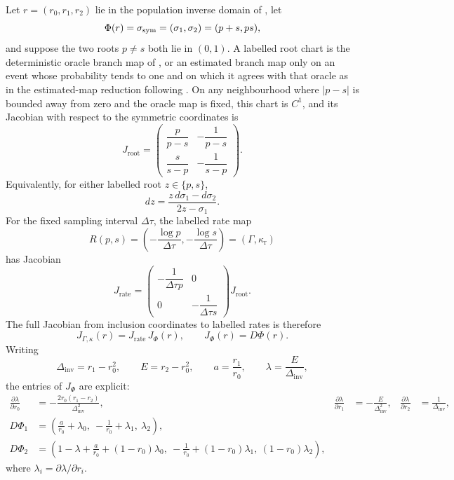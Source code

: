 \begin{lemma}\label{lem:separated-root-rate-delta-main}
Let \(r=(r_0,r_1,r_2)\) lie in the population inverse domain of
, let
\[
\Phi(r)=\sigma_{\rm sym}=(\sigma_1,\sigma_2)=(p+s,ps),
\]
and suppose the two roots \(p\ne s\) both lie in \((0,1)\).  A labelled root
chart is the deterministic oracle branch map of
, or an estimated branch map only on
an event whose probability tends to one and on which it agrees with that
oracle as in the estimated-map reduction following
.  On any
neighbourhood where \(|p-s|\) is bounded away from zero and the oracle map is
fixed, this chart is \(C^1\), and its Jacobian with respect to the
symmetric coordinates is
\begin{equation}\label{eq:separated-root-jacobian-main}
J_{\mathrm{root}}
=
\begin{pmatrix}
\dfrac{p}{p-s} & -\dfrac1{p-s}\\[1.1em]
\dfrac{s}{s-p} & -\dfrac1{s-p}
\end{pmatrix}.
\end{equation}
Equivalently, for either labelled root \(z\in\{p,s\}\),
\[
dz=\frac{z\,d\sigma_1-d\sigma_2}{2z-\sigma_1}.
\]
For the fixed sampling interval \(\Delta\tau\), the labelled rate map
\[
R(p,s)=\left(-\frac{\log p}{\Delta\tau},
              -\frac{\log s}{\Delta\tau}\right)
=(\Gamma,\kappa_{\mathrm r})
\]
has Jacobian
\begin{equation}\label{eq:separated-rate-jacobian-main}
J_{\mathrm{rate}}
=
\begin{pmatrix}
-\dfrac1{\Delta\tau p} & 0\\[0.8em]
0 & -\dfrac1{\Delta\tau s}
\end{pmatrix}
J_{\mathrm{root}} .
\end{equation}
The full Jacobian from inclusion coordinates to labelled rates is therefore
\begin{equation}\label{eq:inclusion-to-rate-jacobian-main}
J_{\Gamma,\kappa}(r)
=J_{\mathrm{rate}}\,J_\Phi(r),
\qquad
J_\Phi(r)=D\Phi(r).
\end{equation}
Writing
\[
\Delta_{\mathrm{inv}}=r_1-r_0^2,\qquad E=r_2-r_0^2,\qquad
a=\frac{r_1}{r_0},\qquad \lambda=\frac{E}{\Delta_{\mathrm{inv}}},
\]
the entries of \(J_\Phi\) are explicit:
\begin{align}
\frac{\partial\lambda}{\partial r_0}
&=-\frac{2r_0(r_1-r_2)}{\Delta_{\mathrm{inv}}^2},&
\frac{\partial\lambda}{\partial r_1}
&=-\frac{E}{\Delta_{\mathrm{inv}}^2},&
\frac{\partial\lambda}{\partial r_2}
&=\frac1{\Delta_{\mathrm{inv}}}, \label{eq:lambda-gradient-main}\\
D\Phi_1
&=
\left(
\frac{a}{r_0}+\lambda_{0},\
-\frac1{r_0}+\lambda_{1},\
\lambda_{2}
\right),\nonumber\\
D\Phi_2
&=
\left(
1-\lambda+\frac{a}{r_0}+(1-r_0)\lambda_{0},\
-\frac1{r_0}+(1-r_0)\lambda_{1},\
(1-r_0)\lambda_{2}
\right), \label{eq:phi-jacobian-main}
\end{align}
where \(\lambda_i=\partial\lambda/\partial r_i\).


\end{lemma}
